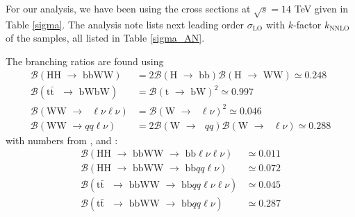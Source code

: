 \documentclass[10pt,a4paper]{article}
\renewcommand{\tt}{$\text{t}\bar{\text{t}}$}
\newcommand{\lnu}{$\ell\nu$}
\newcommand{\BR}{\mathcal{B}}
\begin{document}
For our analysis, we have been using the cross sections at $\sqrt{s}=14$ TeV given in Table \ref{sigma}. The analysis note lists next leading order $\sigma_\text{LO}$ with $k$-factor $k_\text{NNLO}$ of the samples, all listed in Table \ref{sigma_AN}. %

The branching ratios are found using
\begin{align*}
    \mathcal{B}(\text{HH $\rightarrow$ bbWW})
        &= 2\mathcal{B}(\text{H $\rightarrow$ bb})
            \mathcal{B}(\text{H $\rightarrow$ WW})
        \simeq 0.248 \\
    \mathcal{B}(\text{\tt\ $\rightarrow$ bWbW})
        &= \mathcal{B}(\text{t $\rightarrow$ bW})^2
        \simeq 0.997 \\
    \mathcal{B}(\text{WW $\rightarrow$ \lnu\lnu})
        &= \mathcal{B}(\text{W $\rightarrow$ \lnu})^2
        \simeq 0.046 \\
    \mathcal{B}(\text{WW $\rightarrow qq$\lnu})
        &= 2\mathcal{B}(\text{W $\rightarrow$ $qq$})
            \mathcal{B}(\text{W $\rightarrow$ \lnu})
        \simeq 0.288
\end{align*}
with numbers from \cite{BR_HH}, \cite{BR_tt} and \cite{BR_W}:
\begin{align*}
    \mathcal{B}(\text{HH $\rightarrow$ bbWW $\rightarrow$ bb\lnu\lnu})
         &\simeq 0.011\\
    \mathcal{B}(\text{HH $\rightarrow$ bbWW $\rightarrow$ bb$qq$\lnu})
         &\simeq 0.072\\
    \mathcal{B}(\text{\tt\ $\rightarrow$ bbWW $\rightarrow$ bb$qq$\lnu\lnu})
         &\simeq 0.045\\
    \mathcal{B}(\text{\tt\ $\rightarrow$ bbWW $\rightarrow$ bb$qq$\lnu})
         &\simeq 0.287
\end{align*}
\end{document}
